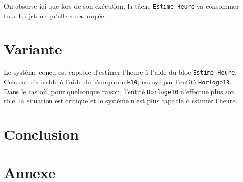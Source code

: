 \documentclass[french]{article}
\begin{document}
	On observe ici que lors de son exécution, la tâche \texttt{Estime\_Heure} va consommer tous les jetons qu'elle aura loupée.
	
	
	\section{Variante}
	
	Le système conçu est capable d'estimer l'heure à l'aide du bloc \texttt{Estime\_Heure}. Cela est réalisable à l'aide du sémaphore \texttt{H10}, envoyé par l'entité \texttt{Horloge10}. Dans le cas où, pour quelconque raison, l'entité \texttt{Horloge10} n'effectue plus son rôle, la situation est critique et le système n'est plus capable d'estimer l'heure.

	\section{Conclusion}
	
	\section{Annexe}
	
\end{document}

